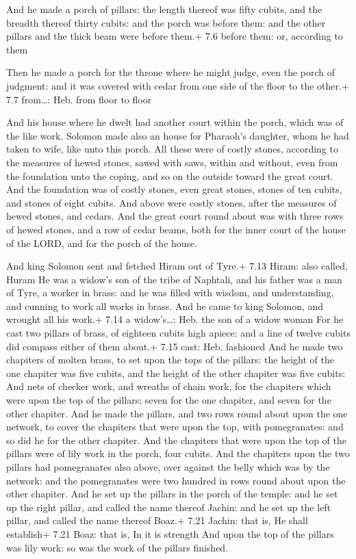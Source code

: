  And he made a porch of pillars; the length thereof was
fifty cubits, and the breadth thereof thirty cubits: and the porch was
before them: and the other pillars and the thick beam were before them.+
7.6 before them: or, according to them

 Then he made a porch for the throne where he might judge,
even the porch of judgment: and it was covered with cedar from one side
of the floor to the other.+ 7.7 from\ldots: Heb. from floor to floor

 And his house where he dwelt had another court within the
porch, which was of the like work. Solomon made also an house for
Pharaoh's daughter, whom he had taken to wife, like unto this porch.
 All these were of costly stones, according to the measures
of hewed stones, sawed with saws, within and without, even from the
foundation unto the coping, and so on the outside toward the great
court.  And the foundation was of costly stones, even great
stones, stones of ten cubits, and stones of eight cubits. 
And above were costly stones, after the measures of hewed stones, and
cedars.  And the great court round about was with three
rows of hewed stones, and a row of cedar beams, both for the inner court
of the house of the LORD, and for the porch of the house.

 And king Solomon sent and fetched Hiram out of Tyre.+
7.13 Hiram: also called, Huram  He was a widow's son of the
tribe of Naphtali, and his father was a man of Tyre, a worker in brass:
and he was filled with wisdom, and understanding, and cunning to work
all works in brass. And he came to king Solomon, and wrought all his
work.+ 7.14 a widow's\ldots: Heb. the son of a widow woman 
For he cast two pillars of brass, of eighteen cubits high apiece: and a
line of twelve cubits did compass either of them about.+ 7.15 cast: Heb.
fashioned  And he made two chapiters of molten brass, to
set upon the tops of the pillars: the height of the one chapiter was
five cubits, and the height of the other chapiter was five cubits:
 And nets of checker work, and wreaths of chain work, for
the chapiters which were upon the top of the pillars; seven for the one
chapiter, and seven for the other chapiter.  And he made
the pillars, and two rows round about upon the one network, to cover the
chapiters that were upon the top, with pomegranates: and so did he for
the other chapiter.  And the chapiters that were upon the
top of the pillars were of lily work in the porch, four cubits.
 And the chapiters upon the two pillars had pomegranates
also above, over against the belly which was by the network: and the
pomegranates were two hundred in rows round about upon the other
chapiter.  And he set up the pillars in the porch of the
temple: and he set up the right pillar, and called the name thereof
Jachin: and he set up the left pillar, and called the name thereof
Boaz.+ 7.21 Jachin: that is, He shall establish+ 7.21 Boaz: that is, In
it is strength  And upon the top of the pillars was lily
work: so was the work of the pillars finished.

